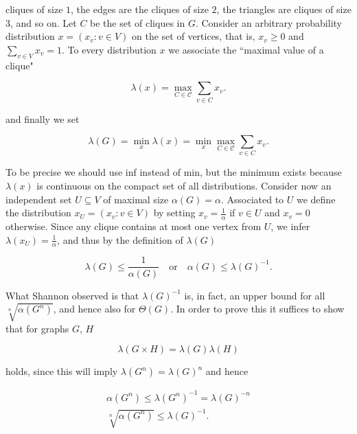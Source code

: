 cliques of size $1$, the edges are the cliques of size $2$, the triangles are cliques 
of size $3$, and so on. Let $C$ be the set of cliques in $G$. Consider an arbitrary 
probability distribution $x = (x_v : v \in V)$ on the set of vertices, that 
is, $x_v \geq 0$ and $\sum_{v \in V} x_v = 1$. To every distribution $x$ we associate 
the ``maximal value of a clique"

\begin{equation*}
\lambda(x) = \max_{C \in \mathcal{C}} \sum_{v\in C} x_v.
\end{equation*}

and finally we set

\begin{equation*}
\lambda(G) = \min_x\lambda(x) = \min_x\max_{C \in \mathcal{C}} \sum_{v\in C} x_v.
\end{equation*}

To be precise we should use inf instead of min, but the minimum exists
because $\lambda(x)$ is continuous on the compact set of all distributions.
Consider now an independent set $U \subseteq V$ of maximal size $\alpha(G) = \alpha $.
Associated to $U$ we define the distribution $x_U  = (x_v : v \in V)$ by setting 
$x_v = \frac{1}{\alpha}$ if $v \in U$ and $x_v = 0$ otherwise. Since any clique contains at most 
one vertex from $U$,  we infer $\lambda(x_U) = \frac{1}{\alpha} $, 
and thus by the definition of $\lambda(G)$

\begin{equation*}
\lambda(G) \leq \frac{1}{\alpha(G)} \quad \text{or} \quad \alpha(G) \leq \lambda(G)^{-1}.
\end{equation*}

What Shannon observed is that $\lambda(G)^{-1}$ is, in fact, an upper bound for all 
$\sqrt[n]{\alpha(G^n)}$, and hence also for $\Theta(G)$. In order to prove this it suffices to 
show that for graphs $G$, $H$

\begin{equation}
\lambda(G \times H) = \lambda(G)\lambda(H) \label{one}
\end{equation}

holds, since this will imply $\lambda(G^n) = \lambda(G)^n$ and hence

\begin{equation*}
  \begin{align*}
  \alpha(G^n) \leq \lambda(G^n)^{-1} = \lambda(G)^{-n} \\
  \sqrt[n]{\alpha(G^n)} \leq \lambda(G)^{-1}.
  \end{align*}
\end{equation*}

